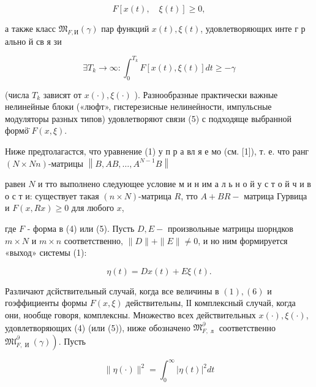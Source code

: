 \documentclass[10pt]{article}
\begin{document}
\[

F[x(t), \quad \xi(t)] \geqslant 0,

\]



а также класс $\mathfrak{M}_{F, И}(\gamma)$ пар функций $x(t), \xi(t)$, удовлетворяющих инте г р ально й св я зи



\[

\exists T_{k} \longrightarrow \infty: \int_{0}^{T_{k}} F[x(t), \xi(t)] d t \geqslant-\gamma

\]



(числа $T_{k}$ зависят от $x(\cdot), \xi(\cdot)$ ). Разнообразные практически важные нелинейные блоки («люфт», гистерезисные нелинеӥности, импульсные модуляторы разных типов) удовлетворяют связи (5) с подходяще выбранной формӧ̈ $F(x, \xi)$.



Ниже предтолагастся, что уравнение (1) у п р а вл я е мо (см. [1]), т. е. что ранг $(N \times N n)$-матрицы $\left\|B, A B, \ldots, A^{N-1} B\right\|$



равен $N$ и тто выполнено следующее условие м и н им а л ь н о й у с т о й ч и в о с т и: существует такая $(n \times N)$-матрица $R$, тто $A+B R-$ матрица Гурвица и $F(x, R x) \geqslant 0$ для любого $x$,



где $F$ - форма в (4) или (5). Пусть $D, E-$ произвольные матрицы шорндков $m \times N$ и $m \times n$ соответственно, $\|D\|+\|E\| \neq 0$, и но ним формируется «выход» системы (1):



\[

\eta(t)=D x(t)+E \xi(t) .

\]



Различают дсйствительный случай, когда все величины в $(1),(6)$ и гоэффициенты формы $F(x, \xi)$ действительны, ІІ комплексный случай, когда они, нообще говоря, комплексны. Множество всех действительных $x(\cdot), \xi(\cdot)$, удовлетворяющих (4) (или (5)), ниже обозначено $\mathfrak{M}_{F, \text { л }}^{\partial}$ соответственно $\left.\mathfrak{M l}_{F, \text { И }}^{\partial}(\gamma)\right)$. Пусть



\[

\|\eta(\cdot)\|^{2}=\int_{0}^{\infty}|\eta(t)|^{2} d t

\]
\end{document}
